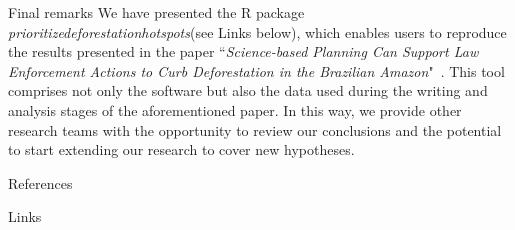 \documentclass[20pt]{beamer}
\begin{document}
\begin{frame}[fragile,t]
\begin{columns}[t]
\begin{column}{0.33\linewidth}
\vspace{1cm}
    \begin{block}{Final remarks\vphantom{g}}
We have presented the \textsf{R} package \textit{prioritizedeforestationhotspots}(see Links below), which enables users to reproduce the results presented in the paper ``\textit{Science-based Planning Can Support Law Enforcement Actions to Curb Deforestation in the Brazilian Amazon}"~\cite{mataveli2022,mataveli2023}.
This tool comprises not only the software but also the data used during the writing and analysis stages of the aforementioned paper.
In this way, we provide other research teams with the opportunity to review our conclusions and the potential to start extending our research to cover new hypotheses.
    \end{block}

\vspace{1cm}    
    \begin{block}{References\vphantom{g}}


    \end{block}


\vspace{1.0cm}    
    \begin{block}{Links}


\end{block}
\end{column}
\end{columns}
\end{frame}
\end{document}
